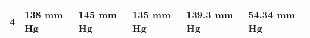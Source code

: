 \begin{table}[H]
\begin{tabular}{|l|l|l|l|l|l|}
		4                                                        & 138 mm Hg                                                      & 145 mm Hg                                                      & 135 mm Hg                                                       & 139.3 mm Hg                                             & 54.34 mm Hg                                             \\ \hline
	\end{tabular}
\end{table}